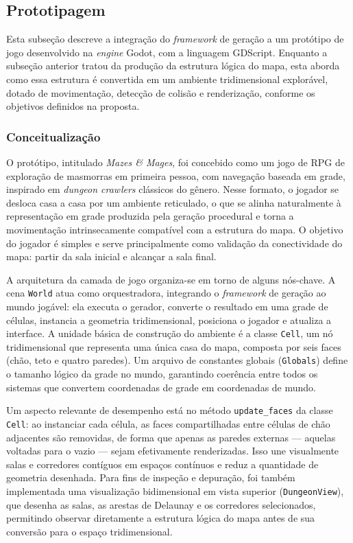 \documentclass[12pt]{article}
\begin{document}
\subsection{Prototipagem}
Esta subseção descreve a integração do \textit{framework} de geração a um protótipo de jogo desenvolvido na \textit{engine}
Godot, com a linguagem GDScript. Enquanto a subseção anterior tratou da produção da estrutura lógica do mapa, esta aborda como
essa estrutura é convertida em um ambiente tridimensional explorável, dotado de movimentação, detecção de colisão e renderização,
conforme os objetivos definidos na proposta.
 
\subsubsection{Conceitualização}
O protótipo, intitulado \textit{Mazes \& Mages}, foi concebido como um jogo de RPG de exploração de masmorras em primeira pessoa,
com navegação baseada em grade, inspirado em \textit{dungeon crawlers} clássicos do gênero. Nesse formato, o jogador se desloca
casa a casa por um ambiente reticulado, o que se alinha naturalmente à representação em grade produzida pela geração procedural e
torna a movimentação intrinsecamente compatível com a estrutura do mapa. O objetivo do jogador é simples e serve principalmente
como validação da conectividade do mapa: partir da sala inicial e alcançar a sala final.
 
A arquitetura da camada de jogo organiza-se em torno de alguns nós-chave. A cena \texttt{World} atua como orquestradora,
integrando o \textit{framework} de geração ao mundo jogável: ela executa o gerador, converte o resultado em uma grade de células,
instancia a geometria tridimensional, posiciona o jogador e atualiza a interface. A unidade básica de construção do ambiente é a
classe \texttt{Cell}, um nó tridimensional que representa uma única casa do mapa, composta por seis faces (chão, teto e quatro
paredes). Um arquivo de constantes globais (\texttt{Globals}) define o tamanho lógico da grade no mundo, garantindo coerência
entre todos os sistemas que convertem coordenadas de grade em coordenadas de mundo.
 
Um aspecto relevante de desempenho está no método \texttt{update\_faces} da classe \texttt{Cell}: ao instanciar cada célula, as
faces compartilhadas entre células de chão adjacentes são removidas, de forma que apenas as paredes externas — aquelas voltadas
para o vazio — sejam efetivamente renderizadas. Isso une visualmente salas e corredores contíguos em espaços contínuos e reduz a
quantidade de geometria desenhada. Para fins de inspeção e depuração, foi também implementada uma visualização bidimensional em
vista superior (\texttt{DungeonView}), que desenha as salas, as arestas de Delaunay e os corredores selecionados, permitindo
observar diretamente a estrutura lógica do mapa antes de sua conversão para o espaço tridimensional.
 
\end{document}
